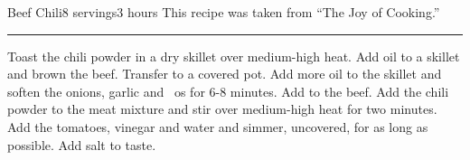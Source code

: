 \begin{recipe}{Beef Chili}{8 servings}{3 hours}
\freeform This recipe was taken from ``The Joy of Cooking.''\\
\rule{\textwidth}{0.05pt}
Toast the chili powder in a dry skillet over medium-high heat.
Add oil to a skillet and brown the beef.  Transfer to a covered pot. 
Add more oil to the skillet and soften the onions, garlic and ~os for 6-8 minutes.  Add to the beef.
\newstep
Add the chili powder to the meat mixture and stir over medium-high heat for two minutes.
Add the tomatoes, vinegar and water and simmer, uncovered, for as long as possible.  Add salt to taste.
\end{recipe}
